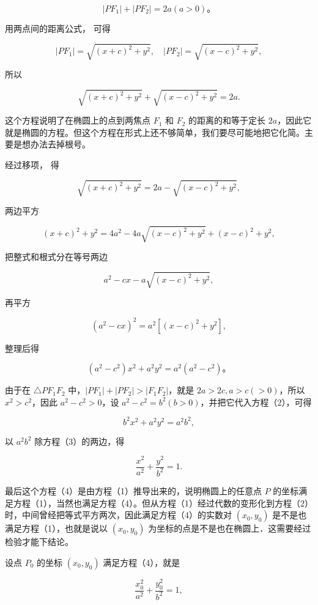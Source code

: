 \[
\left| PF_{1} \right| + \left| PF_{2} \right| = 2 a (a > 0)\text{。}
\]

用两点间的距离公式， 可得

\[
\left| PF_{1} \right| = \sqrt {(x + c) ^ {2} + y^{2}}, \quad \left| PF_{2} \right| = \sqrt {(x - c) ^ {2} + y^{2}},
\]

所以

\[
\sqrt {(x + c) ^ {2} + y^{2}} + \sqrt {(x - c) ^ {2} + y^{2}} = 2 a. \tag {1}
\]

这个方程说明了在椭圆上的点到两焦点 \(F_{1}\) 和 \(F_{2}\)
的距离的和等于定长
\(2a\)，因此它就是椭圆的方程。但这个方程在形式上还不够简单，我们要尽可能地把它化简。主要是想办法去掉根号。

经过移项， 得

\[
\sqrt {(x + c) ^ {2} + y^{2}} = 2 a - \sqrt {(x - c) ^ {2} + y^{2}},
\]

两边平方

\[
(x + c) ^ {2} + y^{2} = 4 a^{2} - 4 a \sqrt {(x - c) ^ {2} + y^{2}} + (x - c) ^ {2} + y^{2},
\]

把整式和根式分在等号两边

\[
a^{2} - c x - a \sqrt {(x - c) ^ {2} + y^{2}},
\]

再平方

\[
(a^{2} - c x) ^ {2} = a^{2} [ (x - c) ^ {2} + y^{2} ],
\]

整理后得

\[
(a^{2} - c^{2}) x^{2} + a^{2} y^{2} = a^{2} (a^{2} - c^{2})\text{。} \tag {2}
\]

由于在 \(\triangle PF_{1}F_{2}\)
中，\(|PF_{1}| + |PF_{2}| > |F_{1}F_{2}|\)，就是
\(2a > 2c, a > c (>0)\)，所以 \(x^{2} > c^{2}\)，因此
\(a^{2} - c^{2} > 0\)，设
\(a^{2} - c^{2} = b^{2}(b > 0)\)，并把它代入方程（2），可得

\[
b^{2} x^{2} + a^{2} y^{2} = a^{2} b^{2}, \tag {3}
\]

以 \(a^2 b^2\) 除方程（3）的两边，得

\[
\frac {x^{2}}{a^{2}} + \frac {y^{2}}{b^{2}} = 1. \tag {4}
\]

最后这个方程（4）是由方程（1）推导出来的，说明椭圆上的任意点 \(P\)
的坐标满足方程（1），当然也满足方程（4）。但从方程（1）经过代数的变形化到方程（2）时，中间曾经把等式平方两次，因此满足方程（4）的实数对
\((x_0, y_0)\) 是不是也满足方程（1），也就是说以 \((x_0, y_0)\)
为坐标的点是不是也在椭圆上．这需要经过检验才能下结论。

设点 \(P_{0}\) 的坐标 \((x_0, y_0)\) 满足方程（4），就是

\[
\frac {x_{0} ^ {2}}{a^{2}} + \frac {y_{0} ^ {2}}{b^{2}} = 1,
\]

